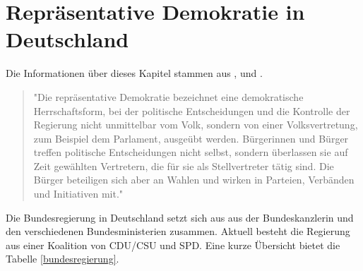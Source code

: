 \section{Repräsentative Demokratie in Deutschland}
Die Informationen über dieses Kapitel stammen aus \cite{bundestag}, \cite{bundesregierung} und \cite{wikipedia}.
\begin{quote}
"Die repräsentative Demokratie bezeichnet eine demokratische Herrschaftsform, bei der politische Entscheidungen und die Kontrolle der Regierung nicht unmittelbar vom Volk, sondern von einer Volksvertretung, zum Beispiel dem Parlament, ausgeübt werden.
Bürgerinnen und Bürger treffen politische Entscheidungen nicht selbst, sondern überlassen sie auf Zeit gewählten Vertretern, die für sie als Stellvertreter tätig sind. Die Bürger beteiligen sich aber an Wahlen und wirken in Parteien, Verbänden und Initiativen mit."
\end{quote}
\cite{bundestag}
Die Bundesregierung in Deutschland setzt sich aus aus der Bundeskanzlerin und den verschiedenen Bundesministerien zusammen. Aktuell besteht die Regierung aus einer Koalition von CDU/CSU und SPD. Eine kurze Übersicht bietet die Tabelle \ref{bundesregierung}. \\
